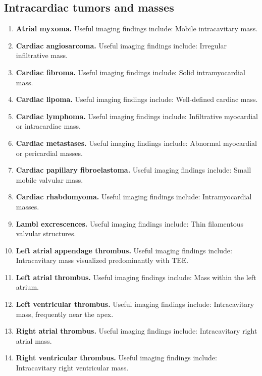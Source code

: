 \subsection{Intracardiac tumors and masses}
\begin{enumerate}[leftmargin=*,itemsep=0.45em,topsep=0.4em]
\item \textbf{Atrial myxoma.} Useful imaging findings include: Mobile intracavitary mass.
\item \textbf{Cardiac angiosarcoma.} Useful imaging findings include: Irregular infiltrative mass.
\item \textbf{Cardiac fibroma.} Useful imaging findings include: Solid intramyocardial mass.
\item \textbf{Cardiac lipoma.} Useful imaging findings include: Well-defined cardiac mass.
\item \textbf{Cardiac lymphoma.} Useful imaging findings include: Infiltrative myocardial or intracardiac mass.
\item \textbf{Cardiac metastases.} Useful imaging findings include: Abnormal myocardial or pericardial masses.
\item \textbf{Cardiac papillary fibroelastoma.} Useful imaging findings include: Small mobile valvular mass.
\item \textbf{Cardiac rhabdomyoma.} Useful imaging findings include: Intramyocardial masses.
\item \textbf{Lambl excrescences.} Useful imaging findings include: Thin filamentous valvular structures.
\item \textbf{Left atrial appendage thrombus.} Useful imaging findings include: Intracavitary mass visualized predominantly with TEE.
\item \textbf{Left atrial thrombus.} Useful imaging findings include: Mass within the left atrium.
\item \textbf{Left ventricular thrombus.} Useful imaging findings include: Intracavitary mass, frequently near the apex.
\item \textbf{Right atrial thrombus.} Useful imaging findings include: Intracavitary right atrial mass.
\item \textbf{Right ventricular thrombus.} Useful imaging findings include: Intracavitary right ventricular mass.
\end{enumerate}

